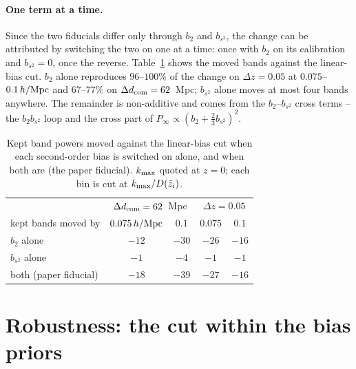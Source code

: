 \documentclass[11pt]{article}
\newcommand{\kmax}{k_{\rm max}}
\newcommand{\hMpc}{\,h/{\rm Mpc}}
\newcommand{\dcom}{$\Delta d_{\rm com} = 62$~Mpc}
\newcommand{\kmaxclause}{$\kmax$ quoted at $z = 0$; each bin is cut at
  $\kmax/D(\bar{z}_i)$.}
\begin{document}
\paragraph{One term at a time.}
Since the two fiducials differ only through $b_2$ and $b_{s^2}$, the
change can be attributed by switching the two on one at a time:
once with $b_2$ on its calibration and $b_{s^2} = 0$, once the
reverse.  Table~\ref{tab:attr} shows the moved bands against the
linear-bias cut.  $b_2$ alone reproduces $96$--$100\%$ of the change
on $\Delta z = 0.05$ at $0.075$--$0.1\hMpc$ and $67$--$77\%$ on
\dcom{}; $b_{s^2}$ alone moves at most four bands anywhere.  The
remainder is non-additive and comes from the $b_2$--$b_{s^2}$ cross
terms -- the $b_2 b_{s^2}$ loop and the cross part of
$P_\infty \propto (b_2 + \tfrac{2}{3} b_{s^2})^2$.

\begin{table}[tbp]
  \centering
  \begin{tabular}{lcccc}
    \hline
    & \multicolumn{2}{c}{\dcom{}} &
      \multicolumn{2}{c}{$\Delta z = 0.05$} \\
    kept bands moved by & $0.075\hMpc$ & $0.1$ & $0.075$ & $0.1$ \\
    \hline
    $b_2$ alone        & $-12$ & $-30$ & $-26$ & $-16$ \\
    $b_{s^2}$ alone    & $-1$  & $-4$  & $-1$  & $-1$  \\
    both (paper fiducial) & $-18$ & $-39$ & $-27$ & $-16$ \\
    \hline
  \end{tabular}
  \caption{Kept band powers moved against the linear-bias cut when
    each second-order bias is switched on alone, and when both are
    (the paper fiducial).  \kmaxclause}
  \label{tab:attr}
\end{table}

\section{Robustness: the cut within the bias priors}
\label{sec:robust}
\end{document}
